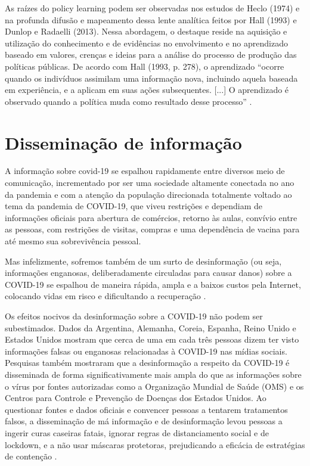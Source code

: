 As raízes do policy learning podem ser observadas nos estudos de Heclo (1974) e na profunda difusão e mapeamento dessa lente analítica feitos por Hall (1993) e Dunlop e Radaelli (2013). Nessa abordagem, o destaque reside na aquisição e utilização do conhecimento e de evidências no envolvimento e no aprendizado baseado em valores, crenças e ideias para a análise do processo de produção das políticas públicas. De acordo com Hall (1993, p. 278), o aprendizado “ocorre quando os indivíduos assimilam uma informação nova, incluindo aquela
baseada em experiência, e a aplicam em suas ações subsequentes. [...] O aprendizado é observado quando a política muda como resultado desse processo” \cite{brasil2020estudos}.

\section{Disseminação de informação}

A informação sobre covid-19 se espalhou rapidamente entre diversos meio de comunicação, incrementado por ser uma sociedade altamente conectada no ano da pandemia e com a atenção da população direcionada totalmente voltado ao tema da pandemia de COVID-19, que viveu restrições e dependiam de informações oficiais para abertura de comércios, retorno às aulas, convívio entre as pessoas, com restrições de visitas, compras e uma dependência de vacina para até mesmo sua sobrevivência pessoal.

Mas infelizmente, sofremos também de um surto de desinformação (ou seja, informações enganosas, deliberadamente circuladas para causar danos) sobre a COVID-19 se espalhou de maneira rápida, ampla e a baixos custos pela Internet, colocando vidas em risco e dificultando a recuperação \cite{Ocombate55:online}.

Os efeitos nocivos da desinformação sobre a COVID-19 não podem ser subestimados. Dados \cite{Navigati3:online} da Argentina, Alemanha, Coreia, Espanha, Reino Unido e Estados Unidos mostram que cerca de uma em cada três pessoas dizem ter visto informações falsas ou enganosas relacionadas à COVID-19 nas mídias sociais. Pesquisas também mostraram que a desinformação a respeito da COVID-19 é disseminada de forma significativamente mais ampla do que as informações sobre o vírus por fontes autorizadas como a Organização Mundial de Saúde (OMS) e os Centros para Controle e Prevenção de Doenças dos Estados Unidos. Ao questionar fontes e dados oficiais e convencer pessoas a tentarem tratamentos falsos, a disseminação de má informação e de desinformação levou pessoas a ingerir curas caseiras fatais, ignorar regras de distanciamento social e de lockdown, e a não usar máscaras protetoras, prejudicando a eficácia de estratégias de contenção \cite{Ocombate55:online}.

